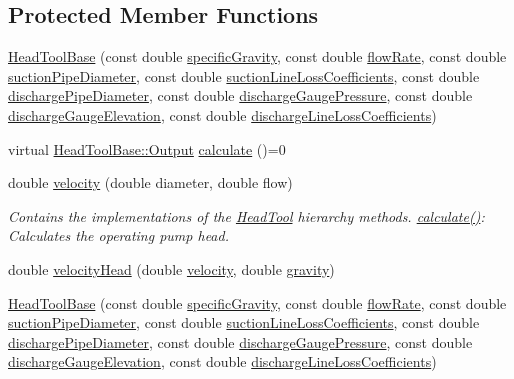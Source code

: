 \subsection*{Protected Member Functions}
\begin{DoxyCompactItemize}
\item 
\hyperlink{class_head_tool_base_ae5bb2325e1266c64b16937d964aea14f}{Head\+Tool\+Base} (const double \hyperlink{class_head_tool_base_ae5af2380fb5db2c25281ef663a5fb65f}{specific\+Gravity}, const double \hyperlink{class_head_tool_base_acf4c03cb62cbf63aba017ce063989fbc}{flow\+Rate}, const double \hyperlink{class_head_tool_base_a357365fc5ef346ce7bcb089c9d1a95e1}{suction\+Pipe\+Diameter}, const double \hyperlink{class_head_tool_base_ac74c6f6f8ab387efe7b77e0ce6ecd84e}{suction\+Line\+Loss\+Coefficients}, const double \hyperlink{class_head_tool_base_a126a397bd3d87b68864e1962c70bb45e}{discharge\+Pipe\+Diameter}, const double \hyperlink{class_head_tool_base_a39c854f13b16967e02a67cd1aaee07c4}{discharge\+Gauge\+Pressure}, const double \hyperlink{class_head_tool_base_a9ed2160992f8da2e335d919cf9aedd08}{discharge\+Gauge\+Elevation}, const double \hyperlink{class_head_tool_base_a147c035c7422406c594c5fd42ab11eb0}{discharge\+Line\+Loss\+Coefficients})
\item 
virtual \hyperlink{struct_head_tool_base_1_1_output}{Head\+Tool\+Base\+::\+Output} \hyperlink{class_head_tool_base_a82024c0ce01699aa24509c964267c392}{calculate} ()=0
\item 
double \hyperlink{class_head_tool_base_a0412306c4adda62e5840342b0d26ac06}{velocity} (double diameter, double flow)
\begin{DoxyCompactList}\small\item\em Contains the implementations of the \hyperlink{class_head_tool}{Head\+Tool} hierarchy methods. \hyperlink{class_head_tool_base_a82024c0ce01699aa24509c964267c392}{calculate()}\+: Calculates the operating pump head. \end{DoxyCompactList}\item 
double \hyperlink{class_head_tool_base_a461c3d53a92763ca08c9a5bbcbef83c3}{velocity\+Head} (double \hyperlink{class_head_tool_base_a0412306c4adda62e5840342b0d26ac06}{velocity}, double \hyperlink{class_head_tool_base_a687da90a9c2f44cb51061d9fad30c002}{gravity})
\item 
\hyperlink{class_head_tool_base_ae5bb2325e1266c64b16937d964aea14f}{Head\+Tool\+Base} (const double \hyperlink{class_head_tool_base_ae5af2380fb5db2c25281ef663a5fb65f}{specific\+Gravity}, const double \hyperlink{class_head_tool_base_acf4c03cb62cbf63aba017ce063989fbc}{flow\+Rate}, const double \hyperlink{class_head_tool_base_a357365fc5ef346ce7bcb089c9d1a95e1}{suction\+Pipe\+Diameter}, const double \hyperlink{class_head_tool_base_ac74c6f6f8ab387efe7b77e0ce6ecd84e}{suction\+Line\+Loss\+Coefficients}, const double \hyperlink{class_head_tool_base_a126a397bd3d87b68864e1962c70bb45e}{discharge\+Pipe\+Diameter}, const double \hyperlink{class_head_tool_base_a39c854f13b16967e02a67cd1aaee07c4}{discharge\+Gauge\+Pressure}, const double \hyperlink{class_head_tool_base_a9ed2160992f8da2e335d919cf9aedd08}{discharge\+Gauge\+Elevation}, const double \hyperlink{class_head_tool_base_a147c035c7422406c594c5fd42ab11eb0}{discharge\+Line\+Loss\+Coefficients})

\end{DoxyCompactItemize}
